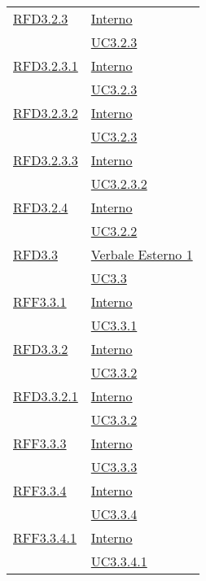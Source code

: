 \begin{longtable}{|>{\centering}m{5cm}|m{5cm}<{\centering}|}
\hyperlink{RFD3.2.3}{RFD3.2.3} & \hyperlink{Interno}{Interno}\\
& \hyperref[UC3.2.3]{UC3.2.3}\\ \hline

\hyperlink{RFD3.2.3.1}{RFD3.2.3.1} & \hyperlink{Interno}{Interno}\\
& \hyperref[UC3.2.3]{UC3.2.3}\\ \hline

\hyperlink{RFD3.2.3.2}{RFD3.2.3.2} & \hyperlink{Interno}{Interno}\\
& \hyperref[UC3.2.3]{UC3.2.3}\\ \hline

\hyperlink{RFD3.2.3.3}{RFD3.2.3.3} & \hyperlink{Interno}{Interno}\\
& \hyperref[UC3.2.3.2]{UC3.2.3.2}\\ \hline

\hyperlink{RFD3.2.4}{RFD3.2.4} & \hyperlink{Interno}{Interno}\\
& \hyperref[UC3.2.2]{UC3.2.2}\\ \hline

\hyperlink{RFD3.3}{RFD3.3} & \hyperlink{Verbale Esterno 1}{Verbale Esterno 1}\\
& \hyperref[UC3.3]{UC3.3}\\ \hline

\hyperlink{RFF3.3.1}{RFF3.3.1} & \hyperlink{Interno}{Interno}\\
& \hyperref[UC3.3.1]{UC3.3.1}\\ \hline

\hyperlink{RFD3.3.2}{RFD3.3.2} & \hyperlink{Interno}{Interno}\\
& \hyperref[UC3.3.2]{UC3.3.2}\\ \hline

\hyperlink{RFD3.3.2.1}{RFD3.3.2.1} & \hyperlink{Interno}{Interno}\\
& \hyperref[UC3.3.2]{UC3.3.2}\\ \hline

\hyperlink{RFF3.3.3}{RFF3.3.3} & \hyperlink{Interno}{Interno}\\
& \hyperref[UC3.3.3]{UC3.3.3}\\ \hline

\hyperlink{RFF3.3.4}{RFF3.3.4} & \hyperlink{Interno}{Interno}\\
& \hyperref[UC3.3.4]{UC3.3.4}\\ \hline

\hyperlink{RFF3.3.4.1}{RFF3.3.4.1} & \hyperlink{Interno}{Interno}\\
& \hyperref[UC3.3.4.1]{UC3.3.4.1}\\ \hline


\end{longtable}
